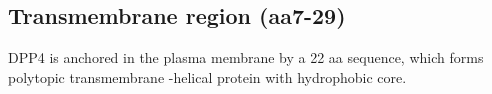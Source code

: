 \subsection{Transmembrane region (aa7-29)}

DPP4 is anchored in the plasma membrane by a 22 aa sequence, which forms polytopic transmembrane \alpha-helical protein with hydrophobic core.~\cite{Hong_1990}